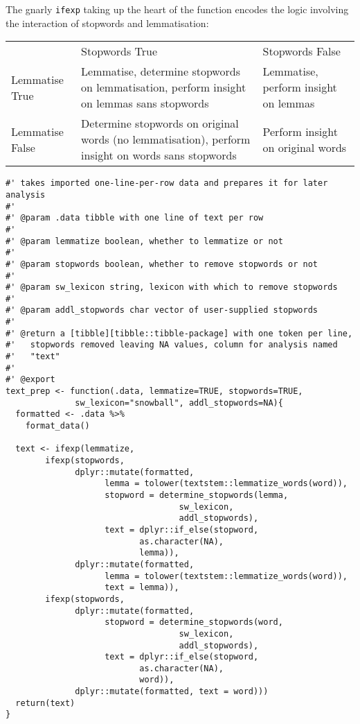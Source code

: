\documentclass[a4paper, 11pt]{article}
\begin{document}
The gnarly \texttt{ifexp} taking up the heart of the function encodes the
logic involving the interaction of stopwords and lemmatisation:

\begin{center}
\begin{tabular}{lll}
 & Stopwords True & Stopwords False\\
Lemmatise True & Lemmatise, determine stopwords on lemmatisation, perform insight on lemmas sans stopwords & Lemmatise, perform insight on lemmas\\
Lemmatise False & Determine stopwords on original words (no lemmatisation), perform insight on words sans stopwords & Perform insight on original words\\
\end{tabular}
\end{center}

\begin{verbatim}
#' takes imported one-line-per-row data and prepares it for later analysis
#'
#' @param .data tibble with one line of text per row
#'
#' @param lemmatize boolean, whether to lemmatize or not
#'
#' @param stopwords boolean, whether to remove stopwords or not
#'
#' @param sw_lexicon string, lexicon with which to remove stopwords
#'
#' @param addl_stopwords char vector of user-supplied stopwords
#'
#' @return a [tibble][tibble::tibble-package] with one token per line,
#'   stopwords removed leaving NA values, column for analysis named
#'   "text"
#'
#' @export
text_prep <- function(.data, lemmatize=TRUE, stopwords=TRUE,
		      sw_lexicon="snowball", addl_stopwords=NA){
  formatted <- .data %>%
    format_data()

  text <- ifexp(lemmatize,
		ifexp(stopwords,
		      dplyr::mutate(formatted,
				    lemma = tolower(textstem::lemmatize_words(word)),
				    stopword = determine_stopwords(lemma,
								   sw_lexicon,
								   addl_stopwords),
				    text = dplyr::if_else(stopword,
						   as.character(NA),
						   lemma)),
		      dplyr::mutate(formatted,
				    lemma = tolower(textstem::lemmatize_words(word)),
				    text = lemma)),
		ifexp(stopwords,
		      dplyr::mutate(formatted,
				    stopword = determine_stopwords(word,
								   sw_lexicon,
								   addl_stopwords),
				    text = dplyr::if_else(stopword,
						   as.character(NA),
						   word)),
		      dplyr::mutate(formatted, text = word)))
  return(text)
}
\end{verbatim}
\end{document}
